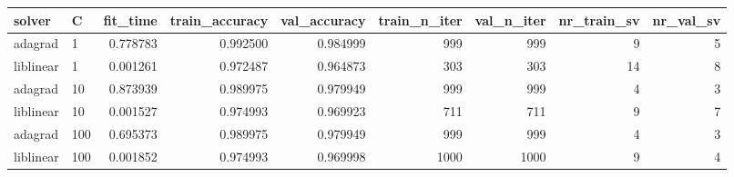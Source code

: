 \begin{tabular}{llrrrrrrr}
\toprule
   solver &   C &  fit\_time &  train\_accuracy &  val\_accuracy &  train\_n\_iter &  val\_n\_iter &  nr\_train\_sv &  nr\_val\_sv \\
\midrule
  adagrad &   1 &  0.778783 &        0.992500 &      0.984999 &           999 &         999 &            9 &          5 \\
liblinear &   1 &  0.001261 &        0.972487 &      0.964873 &           303 &         303 &           14 &          8 \\
  adagrad &  10 &  0.873939 &        0.989975 &      0.979949 &           999 &         999 &            4 &          3 \\
liblinear &  10 &  0.001527 &        0.974993 &      0.969923 &           711 &         711 &            9 &          7 \\
  adagrad & 100 &  0.695373 &        0.989975 &      0.979949 &           999 &         999 &            4 &          3 \\
liblinear & 100 &  0.001852 &        0.974993 &      0.969998 &          1000 &        1000 &            9 &          4 \\
\bottomrule
\end{tabular}
